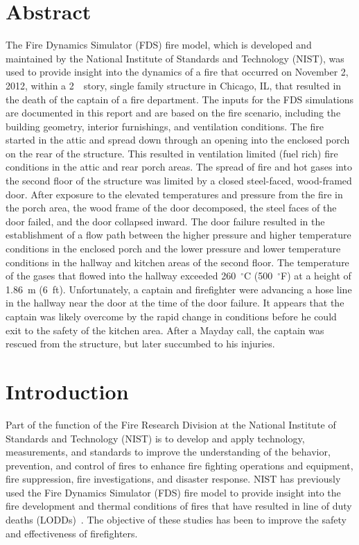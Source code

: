 \documentclass[12pt,oneside]{book}
\begin{document}
\chapter*{\centering Abstract}
The Fire Dynamics Simulator (FDS) fire model, which is developed and maintained by the National Institute of Standards and Technology (NIST), was used to provide insight into the dynamics of a fire that occurred on November 2, 2012, within a 2~~story, single family structure in Chicago, IL, that resulted in the death of the captain of a fire department. The inputs for the FDS simulations are documented in this report and are based on the fire scenario, including the building geometry, interior furnishings, and ventilation conditions. The fire started in the attic and spread down through an opening into the enclosed porch on the rear of the structure. This resulted in ventilation limited (fuel rich) fire conditions in the attic and rear porch areas. The spread of fire and hot gases into the second floor of the structure was limited by a closed steel-faced, wood-framed door. After exposure to the elevated temperatures and pressure from the fire in the porch area, the wood frame of the door decomposed, the steel faces of the door failed, and the door collapsed inward. The door failure resulted in the establishment of a flow path between the higher pressure and higher temperature conditions in the enclosed porch and the lower pressure and lower temperature conditions in the hallway and kitchen areas of the second floor. The temperature of the gases that flowed into the hallway exceeded 260~$^{\circ}$C (500~$^{\circ}$F) at a height of 1.86~m (6~ft). Unfortunately, a captain and firefighter were advancing a hose line in the hallway near the door at the time of the door failure. It appears that the captain was likely overcome by the rapid change in conditions before he could exit to the safety of the kitchen area. After a Mayday call, the captain was rescued from the structure, but later succumbed to his injuries.

\chapter{Introduction}
Part of the function of the Fire Research Division at the National Institute of Standards and Technology (NIST) is to develop and apply technology, measurements, and standards to improve the understanding of the behavior, prevention, and control of fires to enhance fire fighting operations and equipment, fire suppression, fire investigations, and disaster response. NIST has previously used the Fire Dynamics Simulator (FDS) fire model to provide insight into the fire development and thermal conditions of fires that have resulted in line of duty deaths (LODDs)~\cite{Madrzykowski:1,Iowa,Texas,Bryner:Charleston,barowy:texas}. The objective of these studies has been to improve the safety and effectiveness of firefighters.
\end{document}
